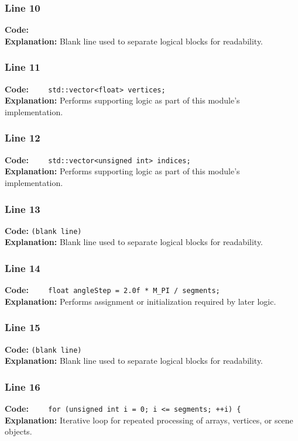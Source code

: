 \documentclass[11pt,a4paper]{article}
\begin{document}
\subsubsection*{Line 10}
\textbf{Code:} \verb|    |\\
\textbf{Explanation:} Blank line used to separate logical blocks for readability.

\subsubsection*{Line 11}
\textbf{Code:} \verb|    std::vector<float> vertices;|\\
\textbf{Explanation:} Performs supporting logic as part of this module's implementation.

\subsubsection*{Line 12}
\textbf{Code:} \verb|    std::vector<unsigned int> indices;|\\
\textbf{Explanation:} Performs supporting logic as part of this module's implementation.

\subsubsection*{Line 13}
\textbf{Code:} \texttt{(blank line)}\\
\textbf{Explanation:} Blank line used to separate logical blocks for readability.

\subsubsection*{Line 14}
\textbf{Code:} \verb|    float angleStep = 2.0f * M_PI / segments;|\\
\textbf{Explanation:} Performs assignment or initialization required by later logic.

\subsubsection*{Line 15}
\textbf{Code:} \texttt{(blank line)}\\
\textbf{Explanation:} Blank line used to separate logical blocks for readability.

\subsubsection*{Line 16}
\textbf{Code:} \verb|    for (unsigned int i = 0; i <= segments; ++i) {|\\
\textbf{Explanation:} Iterative loop for repeated processing of arrays, vertices, or scene objects.
\end{document}
